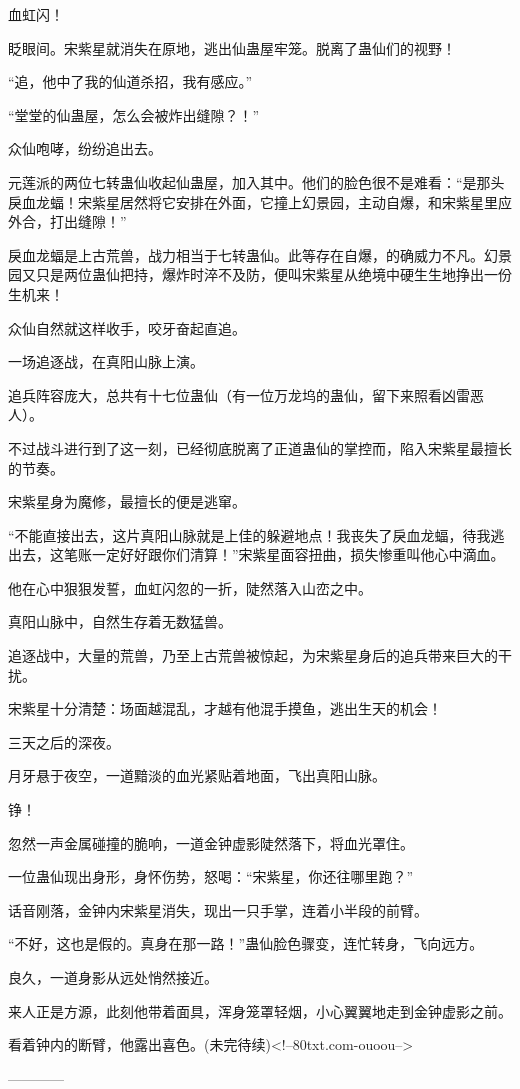 \begin{this_body}
血虹闪！

眨眼间。宋紫星就消失在原地，逃出仙蛊屋牢笼。脱离了蛊仙们的视野！

“追，他中了我的仙道杀招，我有感应。”

“堂堂的仙蛊屋，怎么会被炸出缝隙？！”

众仙咆哮，纷纷追出去。

元莲派的两位七转蛊仙收起仙蛊屋，加入其中。他们的脸色很不是难看：“是那头戾血龙蝠！宋紫星居然将它安排在外面，它撞上幻景园，主动自爆，和宋紫星里应外合，打出缝隙！”

戾血龙蝠是上古荒兽，战力相当于七转蛊仙。此等存在自爆，的确威力不凡。幻景园又只是两位蛊仙把持，爆炸时淬不及防，便叫宋紫星从绝境中硬生生地挣出一份生机来！

众仙自然就这样收手，咬牙奋起直追。

一场追逐战，在真阳山脉上演。

追兵阵容庞大，总共有十七位蛊仙（有一位万龙坞的蛊仙，留下来照看凶雷恶人）。

不过战斗进行到了这一刻，已经彻底脱离了正道蛊仙的掌控而，陷入宋紫星最擅长的节奏。

宋紫星身为魔修，最擅长的便是逃窜。

“不能直接出去，这片真阳山脉就是上佳的躲避地点！我丧失了戾血龙蝠，待我逃出去，这笔账一定好好跟你们清算！”宋紫星面容扭曲，损失惨重叫他心中滴血。

他在心中狠狠发誓，血虹闪忽的一折，陡然落入山峦之中。

真阳山脉中，自然生存着无数猛兽。

追逐战中，大量的荒兽，乃至上古荒兽被惊起，为宋紫星身后的追兵带来巨大的干扰。

宋紫星十分清楚：场面越混乱，才越有他混手摸鱼，逃出生天的机会！

三天之后的深夜。

月牙悬于夜空，一道黯淡的血光紧贴着地面，飞出真阳山脉。

铮！

忽然一声金属碰撞的脆响，一道金钟虚影陡然落下，将血光罩住。

一位蛊仙现出身形，身怀伤势，怒喝：“宋紫星，你还往哪里跑？”

话音刚落，金钟内宋紫星消失，现出一只手掌，连着小半段的前臂。

“不好，这也是假的。真身在那一路！”蛊仙脸色骤变，连忙转身，飞向远方。

良久，一道身影从远处悄然接近。

来人正是方源，此刻他带着面具，浑身笼罩轻烟，小心翼翼地走到金钟虚影之前。

看着钟内的断臂，他露出喜色。(未完待续)<!--80txt.com-ouoou-->

------------

\end{this_body}

